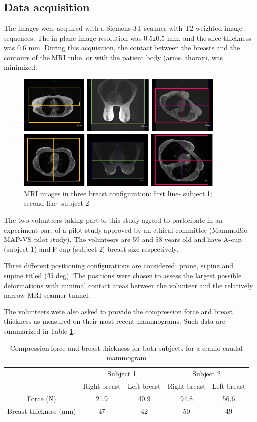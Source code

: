\subsection{Data acquisition}%

 The images were acquired with a Siemens 3T scanner with T2 weighted image sequences. The in-plane image resolution was $0.5$x$0.5$ mm, and the slice thickness was 0.6 mm. During this acquisition, the contact between the breasts and the contours of the MRI tube, or with the patient body (arms, thorax), was minimized.
\begin{figure}[H]
\centering
\includegraphics[width=0.9\textwidth,keepaspectratio]{figures/patientData.png} 
\caption{MRI images in three breast configuration: first line- subject 1; second line- subject 2}\label{fig:patientdata}
\end{figure}

The two volunteers taking part to this study agreed to participate in an experiment part of a pilot study approved by an ethical committee (MammoBio MAP-VS pilot study). The volunteers are 59 and 58 years old and have A-cup (subject 1) and F-cup (subject 2) breast size respectively. 

Three different positioning configurations are considered: prone, supine and supine titled (\~ 45 deg). The positions were chosen to assess the largest possible deformations with minimal contact areas between the volunteer and the relatively narrow MRI scanner tunnel. 

The volunteers were also asked to provide the compression force and breast thickness as measured on their most recent mammograms. Such data are summarized in Table \ref{tab:forceandthichnessdata}.
\begin{table}[H]
\centering
\begin{tabular}{c|c|c||c|c|}
\cline{2-5}
&\multicolumn{2}{c||}{Subject 1}&\multicolumn{2}{c|}{Subject 2}\\
\cline{2-5}
& Right breast & Left breast & Right breast & Left breast\\
\cline{2-5}
\hline
\multicolumn{1}{|c||}{Force (N)}  & 21.9 &40.9 &94.8 & 56.6 \\
\hline
\multicolumn{1}{|c||}{ Breast thickness (mm)} & 47 & 42 & 50 & 49 \\
\hline

\end{tabular}
\caption{Compression force and breast thickness for both subjects for a cranio-caudal mammogram}\label{tab:forceandthichnessdata}
\end{table}


